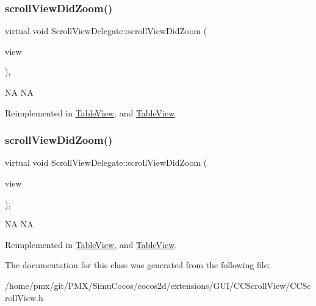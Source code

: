 \subsubsection{\texorpdfstring{scroll\+View\+Did\+Zoom()}{scrollViewDidZoom()}\hspace{0.1cm}{\footnotesize\ttfamily [1/2]}}
{\footnotesize\ttfamily virtual void Scroll\+View\+Delegate\+::scroll\+View\+Did\+Zoom (\begin{DoxyParamCaption}\item[{\hyperlink{classScrollView}{Scroll\+View} $\ast$}]{view }\end{DoxyParamCaption})\hspace{0.3cm}{\ttfamily [inline]}, {\ttfamily [virtual]}}

NA  NA 

Reimplemented in \hyperlink{classTableView_a5c83605ee0059fa74e9c184301cbb368}{Table\+View}, and \hyperlink{classTableView_a5c83605ee0059fa74e9c184301cbb368}{Table\+View}.

\mbox{\label{classScrollViewDelegate_a442695e2f1b1d9ee3959a0a5e8d1bd03}} 
\subsubsection{\texorpdfstring{scroll\+View\+Did\+Zoom()}{scrollViewDidZoom()}\hspace{0.1cm}{\footnotesize\ttfamily [2/2]}}
{\footnotesize\ttfamily virtual void Scroll\+View\+Delegate\+::scroll\+View\+Did\+Zoom (\begin{DoxyParamCaption}\item[{\hyperlink{classScrollView}{Scroll\+View} $\ast$}]{view }\end{DoxyParamCaption})\hspace{0.3cm}{\ttfamily [inline]}, {\ttfamily [virtual]}}

NA  NA 

Reimplemented in \hyperlink{classTableView_a5c83605ee0059fa74e9c184301cbb368}{Table\+View}, and \hyperlink{classTableView_a5c83605ee0059fa74e9c184301cbb368}{Table\+View}.



The documentation for this class was generated from the following file\+:\begin{DoxyCompactItemize}
\item 
/home/pmx/git/\+P\+M\+X/\+Simu\+Cocos/cocos2d/extensions/\+G\+U\+I/\+C\+C\+Scroll\+View/C\+C\+Scroll\+View.\+h\end{DoxyCompactItemize}
